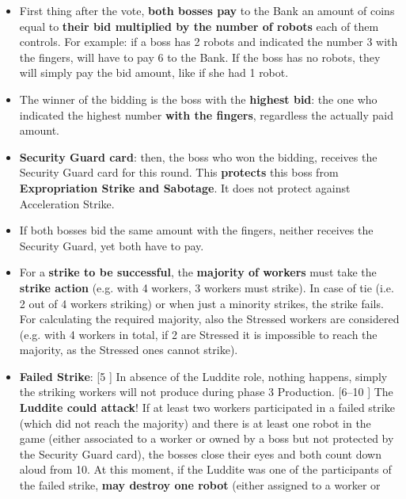         \begin{itemize}
            \item First thing after the vote, \textbf{both bosses pay} to the Bank an amount of coins
            equal to \textbf{their bid multiplied by the number of robots} each of them controls.
            For example: if a boss has 2 robots and indicated the number 3 with
            the fingers, will have to pay 6 to the Bank. If the boss has no robots, they will
            simply pay the bid amount, like if she had 1 robot.
            \item The winner of the bidding is the boss with the \textbf{highest bid}: the one who
            indicated the highest number \textbf{with the fingers}, regardless the actually paid
            amount.
            \item \textbf{Security Guard card}: then, the boss who won the bidding, receives the Security
            Guard card for this round. This \textbf{protects} this boss from \textbf{Expropriation
            Strike and Sabotage}. It does not protect against Acceleration Strike.
            \item If both bosses bid the same amount with the fingers, neither receives the
            Security Guard, yet both have to pay.
            \item For a \textbf{strike to be successful}, the \textbf{majority of workers} must take the \textbf{strike
            action} (e.g. with 4 workers, 3 workers must strike). In case of tie (i.e. 2 out of
            4 workers striking) or when just a minority strikes, the strike fails. For calculating
            the required majority, also the Stressed workers are considered (e.g. with
            4 workers in total, if 2 are Stressed it is impossible to reach the majority, as
            the Stressed ones cannot strike).
            \item \textbf{Failed Strike}: [5 \faPeopleGroup] In absence of the Luddite role, nothing happens, simply
            the striking workers will not produce during phase 3 Production. [6–10 \faPeopleGroup]
            The \textbf{Luddite could attack}! If at least two workers participated in a failed
            strike (which did not reach the majority) and there is at least one robot in the
            game (either associated to a worker or owned by a boss but not protected
            by the Security Guard card), the bosses close their eyes and both count down
            aloud from 10. At this moment, if the Luddite was one of the participants
            of the failed strike, \textbf{may destroy one robot} (either assigned to a worker or

\end{itemize}
